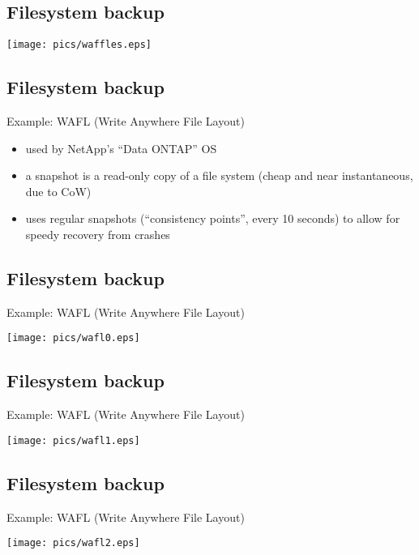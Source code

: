 \documentclass[xga]{xdvislides}
\begin{document}
\subsection{Filesystem backup}
\vspace*{\fill}
\begin{center}
	\texttt{[image: pics/waffles.eps]}
\end{center}
\vspace*{\fill}


\subsection{Filesystem backup}
Example: WAFL (Write Anywhere File Layout)
\begin{itemize}
	\item used by NetApp's ``Data ONTAP'' OS
	\item a snapshot is a read-only copy of a file system (cheap and near
		instantaneous, due to CoW)
	\item uses regular snapshots (``consistency points'', every 10 seconds)
		to allow for speedy recovery from crashes
\end{itemize}

\subsection{Filesystem backup}
Example: WAFL (Write Anywhere File Layout)
\vspace*{\fill}
\begin{center}
	\texttt{[image: pics/wafl0.eps]}
\end{center}
\vspace*{\fill}


\subsection{Filesystem backup}
Example: WAFL (Write Anywhere File Layout)
\vspace*{\fill}
\begin{center}
	\texttt{[image: pics/wafl1.eps]}
\end{center}
\vspace*{\fill}


\subsection{Filesystem backup}
Example: WAFL (Write Anywhere File Layout)
\vspace*{\fill}
\begin{center}
	\texttt{[image: pics/wafl2.eps]}
\end{center}
\vspace*{\fill}
\end{document}

